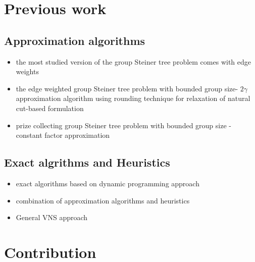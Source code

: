 \documentclass{beamer}
\begin{document}
\section{Previous work}
\subsection*{Approximation algorithms}
\begin{frame}{\insertsection}{\insertsubsection}
    \begin{block}{}
        \begin{itemize}
            \item the most studied version of the group Steiner tree problem comes with edge weights\autocite{gargPolylogarithmicApproximationAlgorithm2000}
            \item the edge weighted group Steiner tree problem with bounded group size-  $2\gamma$ approximation algorithm using rounding technique for relaxation of natural cut-based formulation \autocite{slavikApproximationAlgorithmsSet1998}
            \item prize collecting group Steiner tree problem with bounded group size - constant factor approximation \autocite{glicksmanApproximationAlgorithmsGroup2008}
        \end{itemize}
    \end{block}
\end{frame}

\subsection*{Exact algrithms and Heuristics}
\begin{frame}{\insertsection}{\insertsubsection}
    \begin{block}{}
        \begin{itemize}
            \item exact algorithms based on dynamic programming approach\autocite{liEfficientProgressiveGroup2016}
            \item combination of approximation algorithms and heuristics \autocite{sunFindingGroupSteiner2021}
            \item General VNS approach\autocite{matijevicGeneralVariableNeighborhood2022}
        \end{itemize}
    \end{block}
\end{frame}


\section{Contribution}
\end{document}

